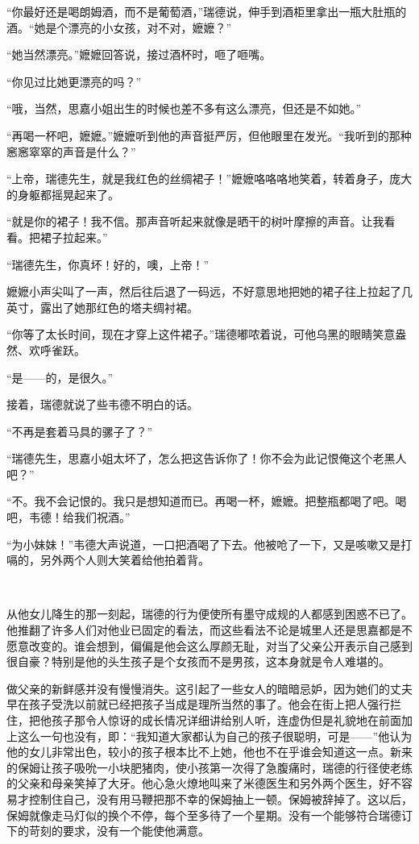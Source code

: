 \par “你最好还是喝朗姆酒，而不是葡萄酒，”瑞德说，伸手到酒柜里拿出一瓶大肚瓶的酒。“她是个漂亮的小女孩，对不对，嬷嬷？”
\par “她当然漂亮。”嬷嬷回答说，接过酒杯时，咂了咂嘴。
\par “你见过比她更漂亮的吗？”
\par “哦，当然，思嘉小姐出生的时候也差不多有这么漂亮，但还是不如她。”
\par “再喝一杯吧，嬷嬷。”嬷嬷听到他的声音挺严厉，但他眼里在发光。“我听到的那种窸窸窣窣的声音是什么？”
\par “上帝，瑞德先生，就是我红色的丝绸裙子！”嬷嬷咯咯咯地笑着，转着身子，庞大的身躯都摇晃起来了。
\par “就是你的裙子！我不信。那声音听起来就像是晒干的树叶摩擦的声音。让我看看。把裙子拉起来。”
\par “瑞德先生，你真坏！好的，噢，上帝！”
\par 嬷嬷小声尖叫了一声，然后往后退了一码远，不好意思地把她的裙子往上拉起了几英寸，露出了她那红色的塔夫绸衬裙。
\par “你等了太长时间，现在才穿上这件裙子。”瑞德嘟哝着说，可他乌黑的眼睛笑意盎然、欢呼雀跃。
\par “是——的，是很久。”
\par 接着，瑞德就说了些韦德不明白的话。
\par “不再是套着马具的骡子了？”
\par “瑞德先生，思嘉小姐太坏了，怎么把这告诉你了！你不会为此记恨俺这个老黑人吧？”
\par “不。我不会记恨的。我只是想知道而已。再喝一杯，嬷嬷。把整瓶都喝了吧。喝吧，韦德！给我们祝酒。”
\par “为小妹妹！”韦德大声说道，一口把酒喝了下去。他被呛了一下，又是咳嗽又是打嗝的，另外两个人则大笑着给他拍着背。
\par  
\par 从他女儿降生的那一刻起，瑞德的行为便使所有墨守成规的人都感到困惑不已了。他推翻了许多人们对他业已固定的看法，而这些看法不论是城里人还是思嘉都是不愿意改变的。谁会想到，偏偏是他会这么厚颜无耻，对当了父亲公开表示自己感到很自豪？特别是他的头生孩子是个女孩而不是男孩，这本身就是令人难堪的。
\par 做父亲的新鲜感并没有慢慢消失。这引起了一些女人的暗暗忌妒，因为她们的丈夫早在孩子受洗以前就已经把孩子当成是理所当然的事了。他会在街上把人强行拦住，把他孩子那令人惊讶的成长情况详细讲给别人听，连虚伪但是礼貌地在前面加上这么一句也没有，即：“我知道大家都认为自己的孩子很聪明，可是——”他认为他的女儿非常出色，较小的孩子根本比不上她，他也不在乎谁会知道这一点。新来的保姆让孩子吸吮一小块肥猪肉，使小孩第一次得了急腹痛时，瑞德的行径使老练的父亲和母亲笑掉了大牙。他心急火燎地叫来了米德医生和另外两个医生，好不容易才控制住自己，没有用马鞭把那不幸的保姆抽上一顿。保姆被辞掉了。这以后，保姆就像走马灯似的换个不停，每个至多待了一个星期。没有一个能够符合瑞德订下的苛刻的要求，没有一个能使他满意。
